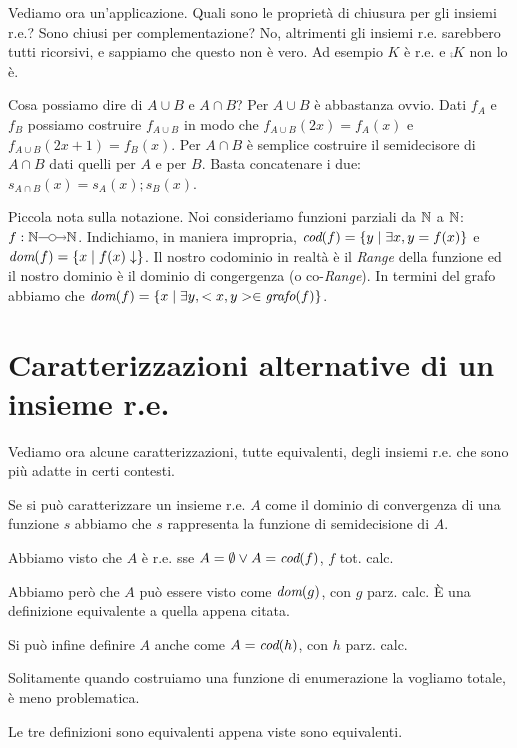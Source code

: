 Vediamo ora un'applicazione. Quali sono le proprietà di chiusura per gli insiemi r.e.? Sono chiusi
per complementazione? No, altrimenti gli insiemi r.e. sarebbero tutti ricorsivi, e sappiamo che
questo non è vero. Ad esempio $K$ è r.e. e $\comp{K}$ non lo è.

Cosa possiamo dire di $A \cup B$ e $A \cap B$? Per $A \cup B$ è abbastanza ovvio. Dati $f_{A}$ e
$f_{B}$ possiamo costruire $f_{A \cup B}$ in modo che $f_{A \cup B}(2x) = f_{A}(x)$ e $f_{A \cup
B}(2x + 1) = f_{B}(x)$. Per $A \cap B$ è semplice costruire il semidecisore di $A \cap B$ dati
quelli per $A$ e per $B$. Basta concatenare i due: $s_{A \cap B}(x) = s_{A}(x);s_{B}(x)$.

Piccola nota sulla notazione. Noi consideriamo funzioni parziali da $\mathbb{N}$ a $\mathbb{N}$: $f: \Nat
\partialto \Nat$. Indichiamo, in maniera impropria, $\textit{cod}(f) = \{y \mid \exists x, y = f(x)\}$ e
$\textit{dom}(f) = \{x \mid f(x) \downarrow\}$. Il nostro codominio in realtà è il \textit{Range} della
funzione ed il nostro dominio è il dominio di congergenza (o co-\textit{Range}). In termini del grafo abbiamo che $\textit{dom}(f)
= \{x \mid \exists y, <x,y> \in \textit{grafo}(f)\}$.

\section{Caratterizzazioni alternative di un insieme r.e.}

Vediamo ora alcune caratterizzazioni, tutte equivalenti, degli insiemi r.e. che sono più adatte in
certi contesti.

Se si può caratterizzare un insieme r.e. $A$ come il dominio di convergenza di una funzione $s$ abbiamo
che $s$ rappresenta la funzione di semidecisione di $A$.

Abbiamo visto che $A$ è r.e. sse $A = \emptyset \lor A = \textit{cod}(f)$, $f$ tot. calc.

Abbiamo però che $A$ può essere visto come $\textit{dom}(g)$, con $g$ parz. calc. È una definizione
equivalente a quella appena citata.

Si può infine definire $A$ anche come $A = \textit{cod}(h)$, con $h$ parz. calc.

Solitamente quando costruiamo una funzione di enumerazione la vogliamo totale, è meno problematica.

Le tre definizioni sono equivalenti appena viste sono equivalenti. 

